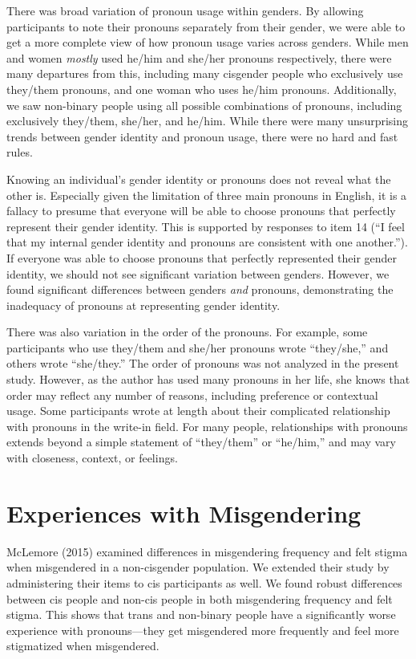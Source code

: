 \documentclass[12pt,twoside]{reedthesis}
\begin{document}
There was broad variation of pronoun usage within genders. By allowing participants to note their pronouns separately from their gender, we were able to get a more complete view of how pronoun usage varies across genders. While men and women \emph{mostly} used he/him and she/her pronouns respectively, there were many departures from this, including many cisgender people who exclusively use they/them pronouns, and one woman who uses he/him pronouns. Additionally, we saw non-binary people using all possible combinations of pronouns, including exclusively they/them, she/her, and he/him. While there were many unsurprising trends between gender identity and pronoun usage, there were no hard and fast rules.

Knowing an individual's gender identity or pronouns does not reveal what the other is. Especially given the limitation of three main pronouns in English, it is a fallacy to presume that everyone will be able to choose pronouns that perfectly represent their gender identity. This is supported by responses to item 14 (``I feel that my internal gender identity and pronouns are consistent with one another.''). If everyone was able to choose pronouns that perfectly represented their gender identity, we should not see significant variation between genders. However, we found significant differences between genders \emph{and} pronouns, demonstrating the inadequacy of pronouns at representing gender identity.

There was also variation in the order of the pronouns. For example, some participants who use they/them and she/her pronouns wrote ``they/she,'' and others wrote ``she/they.'' The order of pronouns was not analyzed in the present study. However, as the author has used many pronouns in her life, she knows that order may reflect any number of reasons, including preference or contextual usage. Some participants wrote at length about their complicated relationship with pronouns in the write-in field. For many people, relationships with pronouns extends beyond a simple statement of ``they/them'' or ``he/him,'' and may vary with closeness, context, or feelings.

\hypertarget{experiences-with-misgendering-1}{%
\section{Experiences with Misgendering}\label{experiences-with-misgendering-1}}

McLemore (2015) examined differences in misgendering frequency and felt stigma when misgendered in a non-cisgender population. We extended their study by administering their items to cis participants as well. We found robust differences between cis people and non-cis people in both misgendering frequency and felt stigma. This shows that trans and non-binary people have a significantly worse experience with pronouns---they get misgendered more frequently and feel more stigmatized when misgendered.
\end{document}
